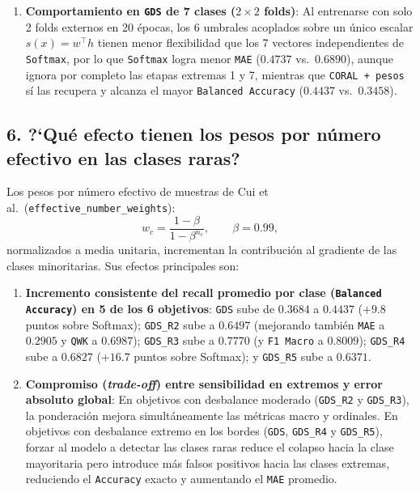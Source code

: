 \documentclass[11pt,a4paper]{article}
\begin{document}
\begin{enumerate}
\begin{itemize}
    \end{itemize}
    \item \textbf{Comportamiento en \texttt{GDS} de 7 clases ($2 \times 2$ folds)}:
    Al entrenarse con solo 2 folds externos en 20 \'epocas, los 6 umbrales acoplados sobre un \'unico escalar $s(x)=w^\top h$ tienen menor flexibilidad que los 7 vectores independientes de \texttt{Softmax}, por lo que \texttt{Softmax} logra menor \texttt{MAE} ($0.4737$ vs.\ $0.6890$), aunque ignora por completo las etapas extremas 1 y 7, mientras que \texttt{CORAL + pesos} s\'i las recupera y alcanza el mayor \texttt{Balanced Accuracy} ($\mathbf{0.4437}$ vs.\ $0.3458$).
\end{enumerate}

\subsection{6. ?`Qu\'e efecto tienen los pesos por n\'umero efectivo en las clases raras?}

Los pesos por n\'umero efectivo de muestras de Cui et al.\ (\texttt{effective\_number\_weights}):
\begin{equation}
    w_c = \frac{1 - \beta}{1 - \beta^{n_c}}, \qquad \beta = 0.99,
\end{equation}
normalizados a media unitaria, incrementan la contribuci\'on al gradiente de las clases minoritarias. Sus efectos principales son:
\begin{enumerate}
    \item \textbf{Incremento consistente del recall promedio por clase (\texttt{Balanced Accuracy}) en 5 de los 6 objetivos}:
    \texttt{GDS} sube de $0.3684$ a $\mathbf{0.4437}$ ($+9.8$ puntos sobre Softmax); \texttt{GDS\_R2} sube a $\mathbf{0.6497}$ (mejorando tambi\'en \texttt{MAE} a $\mathbf{0.2905}$ y \texttt{QWK} a $\mathbf{0.6987}$); \texttt{GDS\_R3} sube a $\mathbf{0.7770}$ (y \texttt{F1 Macro} a $\mathbf{0.8009}$); \texttt{GDS\_R4} sube a $\mathbf{0.6827}$ ($+16.7$ puntos sobre Softmax); y \texttt{GDS\_R5} sube a $\mathbf{0.6371}$.
    \item \textbf{Compromiso (\textit{trade-off}) entre sensibilidad en extremos y error absoluto global}:
    En objetivos con desbalance moderado (\texttt{GDS\_R2} y \texttt{GDS\_R3}), la ponderaci\'on mejora simult\'aneamente las m\'etricas macro y ordinales. En objetivos con desbalance extremo en los bordes (\texttt{GDS}, \texttt{GDS\_R4} y \texttt{GDS\_R5}), forzar al modelo a detectar las clases raras reduce el colapso hacia la clase mayoritaria pero introduce m\'as falsos positivos hacia las clases extremas, reduciendo el \texttt{Accuracy} exacto y aumentando el \texttt{MAE} promedio.
\end{enumerate}
\end{document}
